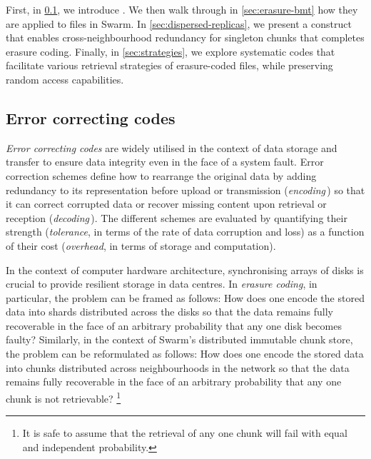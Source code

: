 First, in \ref{sec:error-correcting-codes}, we introduce . We then walk through in \ref{sec:erasure-bmt} how they are applied to files in Swarm. In \ref{sec:dispersed-replicas}, we present a construct that enables cross-neighbourhood redundancy for singleton chunks that completes erasure coding. Finally, in \ref{sec:strategies}, we explore systematic codes that facilitate various retrieval strategies of erasure-coded files, while preserving random access capabilities.

\subsection{Error correcting codes \statusgreen}\label{sec:error-correcting-codes}
%

\emph{Error correcting codes} are widely utilised in the context of data storage and transfer to ensure data integrity even in the face of a system fault. Error correction schemes define how to rearrange the original data by adding redundancy to its representation before upload or transmission (\emph{encoding}\,) so that it can correct corrupted data or recover missing content upon retrieval or reception (\emph{decoding}\,). The different schemes are evaluated by quantifying their strength (\emph{tolerance}, in terms of the rate of data corruption and loss) as a function of their cost (\emph{overhead}, in terms of storage and computation). 

In the context of  computer hardware architecture, synchronising arrays of disks is crucial to provide resilient storage in data centres.
In \emph{erasure coding}, %
%
%
in particular, the problem can be framed as follows: How does one encode the stored data into shards distributed across the disks so that the data remains fully recoverable in the face of an arbitrary probability that any one disk becomes faulty?
Similarly, in the context of Swarm's distributed immutable chunk store, the problem can be reformulated as follows: How does one encode the stored data into chunks distributed across neighbourhoods in the network so that the data remains fully recoverable in the face of an arbitrary probability that any one chunk is not retrievable?%
%
\footnote{%
It is safe to assume that the retrieval of any one chunk will fail with equal and independent probability.}

